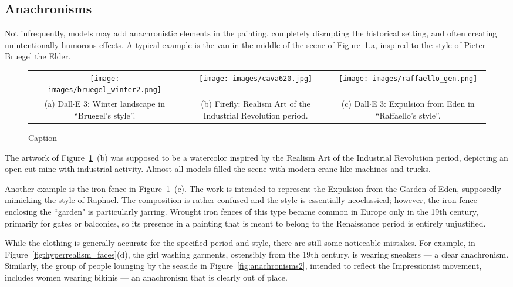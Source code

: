 \documentclass[sn-mathphys]{sn-jnl}
\begin{document}
\subsection{Anachronisms}
\label{sec:anachronisms}
Not infrequently, models may add anachronistic elements in the painting,
completely disrupting the historical setting, and often creating unintentionally humorous effects. A typical example is
the van in the middle of the scene of Figure~\ref{fig:anachronisms}.a, inspired to the style of Pieter Bruegel the Elder.
\begin{figure}[h]
    \centering
    {\footnotesize
    \begin{tabular}{ccc}
          \texttt{[image: images/bruegel\_winter2.png]} &
          \texttt{[image: images/cava620.jpg]} &
          \texttt{[image: images/raffaello\_gen.png]} \\
          (a) \parbox[t]{3.2cm}{Dall$\cdot$E 3: Winter landscape in ``Bruegel's style''.}& (b) \parbox[t]{3.2cm}{Firefly: Realism Art of the
          Industrial Revolution period.} &
          (c) \parbox[t]{3.2cm}{Dall$\cdot$E 3: Expulsion from Eden in ``Raffaello's style''.}
    \end{tabular}
    }
    \caption{Caption}
    \label{fig:anachronisms}
\end{figure}

The artwork of Figure~\ref{fig:anachronisms}~(b) was supposed to be a watercolor inspired by the Realism Art of the Industrial Revolution period, depicting an open-cut mine with industrial activity. Almost all models filled the scene with modern crane-like machines and trucks. 

Another example is the iron fence in Figure~\ref{fig:anachronisms}~(c). The work is intended to represent the Expulsion from the Garden of Eden, supposedly mimicking the style of Raphael. The composition is rather confused and the style is essentially neoclassical; however, the iron fence enclosing the ``garden" is particularly jarring. Wrought iron fences of this type became common in Europe only in the 19th century, primarily for gates or balconies, so its presence in a painting that is meant to belong to the Renaissance period is entirely unjustified.

While the clothing is generally accurate for the specified period and style, there are still some noticeable mistakes. For example, in 
Figure~\ref{fig:hyperrealism_faces}(d), the girl washing garments, ostensibly from the 19th century, is wearing sneakers — a clear anachronism. Similarly, the group of people lounging by the seaside in Figure~\ref{fig:anachronisms2}, intended to reflect the Impressionist movement, includes women wearing bikinis — an anachronism that is clearly out of place.
\end{document}
